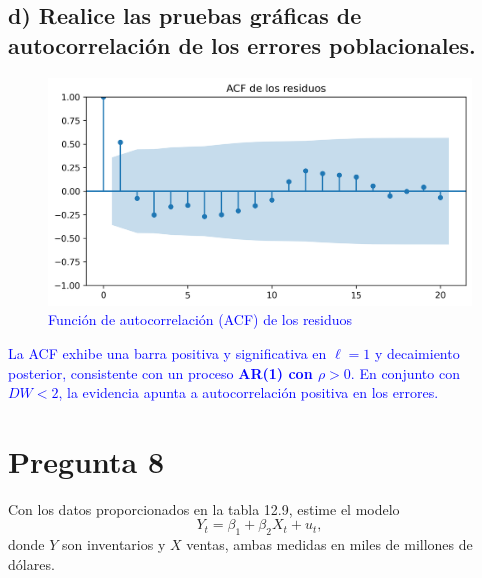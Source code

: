\documentclass[10pt]{article}
\begin{document}
    \subsection{d) Realice las pruebas gráficas de autocorrelación de los errores poblacionales.}
    \textcolor{blue}{
    \begin{figure}[H]
        \centering
        \includegraphics[width=0.95\linewidth]{../plots/python/ex7/ex7_acf_residuos.png}
        \caption{Función de autocorrelación (ACF) de los residuos}
    \end{figure}
    La ACF exhibe una barra positiva y significativa en $\ell=1$ y decaimiento posterior, consistente con un proceso \textbf{AR(1) con $\rho>0$}. En conjunto con $DW<2$, la evidencia apunta a autocorrelación positiva en los errores.
    }
\section{Pregunta 8}
Con los datos proporcionados en la tabla 12.9, estime el modelo
\begin{equation*}
Y_t = \beta_1 + \beta_2 X_t + u_t,
\end{equation*}
\noindent donde $Y$ son inventarios y $X$ ventas, ambas medidas en miles de millones de dólares.
\end{document}
